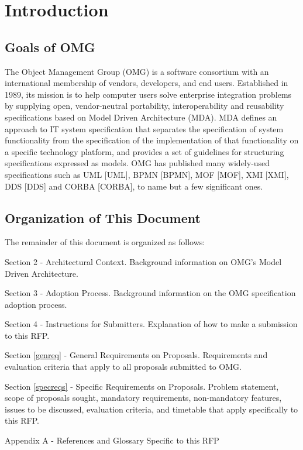 \newpage
\tableofcontents
\newpage

\section{Introduction}
\subsection{Goals of OMG}
The Object Management Group (OMG) is a software consortium with an international membership of vendors, developers, and end users. Established in 1989, its mission is to help computer users solve enterprise integration problems by supplying open, vendor-neutral portability, interoperability and reusability specifications based on Model Driven Architecture (MDA). MDA defines an approach to IT system specification that separates the specification of system functionality from the specification of the implementation of that functionality on a specific technology platform, and provides a set of guidelines for structuring specifications expressed as models. OMG has published many widely-used specifications such as UML [UML], BPMN [BPMN], MOF [MOF], XMI [XMI], DDS [DDS] and CORBA [CORBA], to name but a few significant ones.

\subsection{Organization of This Document}\label{docorg}
The remainder of this document is organized as follows:

Section 2 - Architectural Context. Background information on OMG's Model Driven Architecture. 

Section 3 - Adoption Process. Background information on the OMG specification adoption process.

Section 4 - Instructions for Submitters. Explanation of how to make a submission to this RFP.

Section \ref{genreq} - General Requirements on Proposals. Requirements and evaluation criteria that apply to all proposals submitted to OMG.

Section \ref{specreqs} - Specific Requirements on Proposals. Problem statement, scope of proposals sought, mandatory requirements, non-mandatory features, issues to be discussed, evaluation criteria, and timetable that apply specifically to this RFP. 

Appendix A - References and Glossary Specific to this RFP

